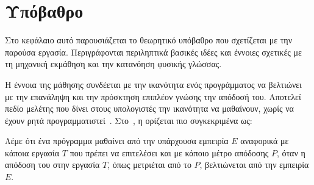 \chapter{Υπόβαθρο}\label{chap:background}

Στο κεφάλαιο αυτό παρουσιάζεται το θεωρητικό υπόβαθρο που σχετίζεται με την παρούσα εργασία.
Περιγράφονται περιληπτικά βασικές ιδέες και έννοιες σχετικές με τη μηχανική εκμάθηση και την κατανόηση φυσικής γλώσσας.

Η έννοια της μάθησης συνδέεται με την ικανότητα ενός προγράμματος να βελτιώνει με την επανάληψη και την πρόσκτηση επιπλέον γνώσης την απόδοσή του.
Αποτελεί πεδίο μελέτης που δίνει στους υπολογιστές την ικανότητα να μαθαίνουν, χωρίς να έχουν ρητά προγραμματιστεί~\cite{samuel1959some}.
Στο~\cite{mitchell1990machine}, η  ορίζεται πιο συγκεκριμένα ως:
\begin{framed}
    Λέμε ότι ένα πρόγραμμα μαθαίνει από την υπάρχουσα εμπειρία $E$ αναφορικά με κάποια εργασία $T$ που πρέπει να επιτελέσει και με κάποιο μέτρο απόδοσης $P$,
    όταν η απόδοση του στην εργασία $T$, όπως μετριέται από το $P$, βελτιώνεται από την εμπειρία $E$.%
\end{framed}

